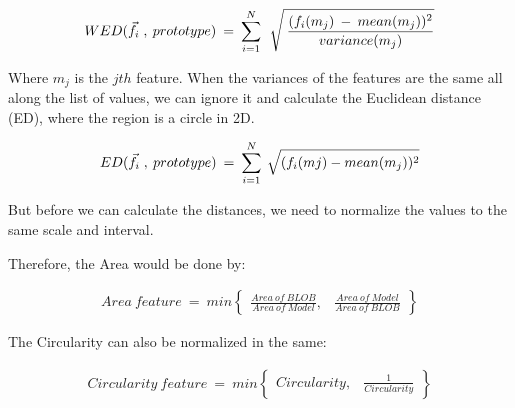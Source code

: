 \begin{equation}	
	\begin{aligned}
{WED(\vec{f}_{i} \; , \: prototype)} \: = \: \displaystyle\sum_{i=1}^N \: \: \sqrt{\mathstrut \:  \displaystyle\frac{(f_{i}(m_{j}) \: - \: mean(m_{j}))^2}{variance(m_{j})}}
\label{Euclidean1}
	\end{aligned}
\end{equation}

Where {$m_{j}$} is the {$jth$} feature. When the variances of the features are the same all along the list of values, we can ignore it and calculate the Euclidean distance (ED), where the region is a circle in 2D.

\begin{equation}	
	\begin{aligned}
{ED(\vec{f}_{i} \; , \: prototype)} \: = \: \displaystyle\sum_{i=1}^N \: \sqrt{\mathstrut (f_{i}(m{j}) - mean(m_{j}))^2}
\label{Euclidean2}
	\end{aligned}
\end{equation}

But before we can calculate the distances, we need to normalize the values to the same scale and interval.

Therefore, the Area would be done by:

\begin{equation}	
	\begin{aligned}
{Area \: feature} \: = \: min \begin{Bmatrix} \displaystyle\frac{Area\:of\:BLOB}{Area\:of\:Model}, & \displaystyle\frac{Area\:of\:Model}{Area\:of\:BLOB}\end{Bmatrix}
\label{NormArea}
	\end{aligned}
\end{equation}

The Circularity can also be normalized in the same:

\begin{equation}	
	\begin{aligned}
{Circularity \: feature} \: = \: min \begin{Bmatrix} {Circularity}, & \displaystyle\frac{1}{Circularity}\end{Bmatrix}
\label{NormCirc}
	\end{aligned}
\end{equation}